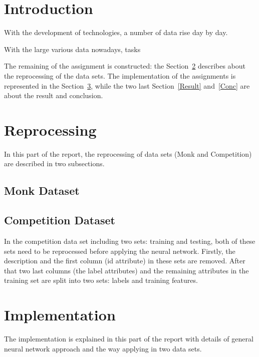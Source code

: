 \documentclass[runningheads,a4paper]{llncs}
\begin{document}
\mainmatter  


\newpage
\tableofcontents
\newpage


\section{Introduction}
\label{Intro}
With the development of technologies, a number of data rise day by day.

With the large various data nowadays, tasks 


The remaining of the assignment is constructed: the Section~\ref{Reprocess} describes about the reprocessing of the data sets.
The implementation of the assignments is represented in the Section~\ref{Implement}, while the two last Section~\ref{Result} and~\ref{Conc} are about the result and conclusion.
	
\section{Reprocessing}
\label{Reprocess}
In this part of the report, the reprocessing of data sets (Monk and Competition) are described in two subsections.
\subsection{Monk Dataset}
\subsection{Competition Dataset}
In the competition data set including two sets: training and testing, both of these sets need to be reprocessed before applying the neural network.
Firstly, the description and the first column (id attribute) in these sets are removed. 
After that two last columns (the label attributes) and the remaining attributes in the training set are split into two sets: labels and training features.
\section{Implementation}
\label{Implement}
The implementation is explained in this part of the report with details of general neural network approach and the way applying in two data sets.
\end{document}
